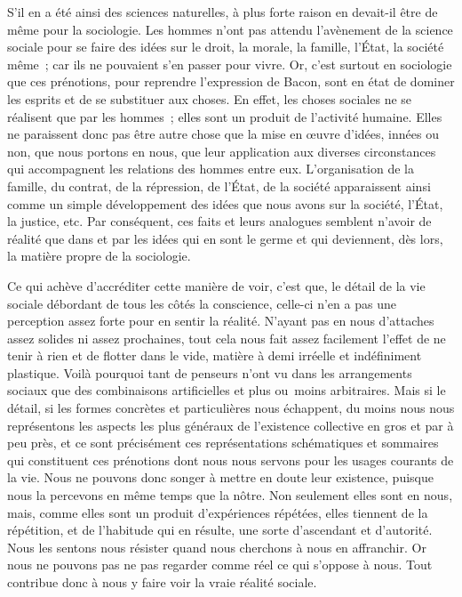 \documentclass[french,twoside]{book} %
\begin{document}
S’il en a été ainsi des sciences naturelles, à plus forte raison en devait-il être de même pour la sociologie. Les hommes n’ont pas attendu l’avènement de la science sociale pour se faire des idées sur le droit, la morale, la famille, l’État, la société même ; car ils ne pouvaient s’en passer pour vivre. Or, c’est surtout en sociologie que ces prénotions, pour reprendre l’expression de Bacon, sont en état de dominer les esprits et de se substituer aux choses. En effet, les choses sociales ne se réalisent que par les hommes ; elles sont un produit de l’activité humaine. Elles ne paraissent donc pas être autre chose que la mise en œuvre d’idées, innées ou non, que nous portons en nous, que leur application aux diverses circonstances qui accompagnent les relations des hommes entre eux. L’organisation de la famille, du contrat, de la répression, de l’État, de la société apparaissent ainsi comme un simple développement des idées que nous avons sur la société, l’État, la justice, etc. Par conséquent, ces faits et leurs analogues semblent n’avoir de réalité que dans et par les idées qui en sont le germe et qui deviennent, dès lors, la matière propre de la sociologie.\par
Ce qui achève d’accréditer cette manière de voir, c’est que, le détail de la vie sociale débordant de tous les côtés la conscience, celle-ci n’en a pas une perception assez forte pour en sentir la réalité. N’ayant pas en nous d’attaches assez solides ni assez prochaines, tout cela nous fait assez facilement l’effet de ne tenir à rien et de flotter dans le vide, matière à demi irréelle et indéfiniment plastique. Voilà pourquoi tant de penseurs n’ont vu dans les arrangements sociaux que des combinaisons artificielles et plus ou moins arbitraires. Mais si le détail, si les formes concrètes et particulières nous échappent, du moins nous nous représentons les aspects les plus généraux de l’existence collective en gros et par à peu près, et ce sont précisément ces représentations schématiques et sommaires qui constituent ces prénotions dont nous nous servons pour les usages courants de la vie. Nous ne pouvons donc songer à mettre en doute leur existence, puisque nous la percevons en même temps que la nôtre. Non seulement elles sont en nous, mais, comme elles sont un produit d’expériences répétées, elles tiennent de la répétition, et de l’habitude qui en résulte, une sorte d’ascendant et d’autorité. Nous les sentons nous résister quand nous cherchons à nous en affranchir. Or nous ne pouvons pas ne pas regarder comme réel ce qui s’oppose à nous. Tout contribue donc à nous y faire voir la vraie réalité sociale.\par
\end{document}
